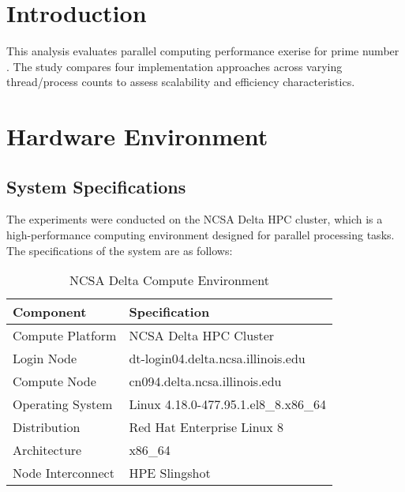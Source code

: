 \documentclass[11pt]{article}
\begin{document}






%








\section{Introduction}
This analysis evaluates parallel computing performance exerise for prime number . The study compares four implementation approaches across varying thread/process counts to assess scalability and efficiency characteristics.

\section{Hardware Environment}

\subsection{System Specifications}
The experiments were conducted on the NCSA Delta HPC cluster, which is a high-performance computing environment designed for parallel processing tasks. The specifications of the system are as follows:
\begin{table}[H]
\centering
\caption{NCSA Delta Compute Environment}
\label{tab:system_specs}
\begin{tabular}{@{}ll@{}}
\hline
\textbf{Component} & \textbf{Specification} \\
\hline
Compute Platform & NCSA Delta HPC Cluster \\
Login Node & dt-login04.delta.ncsa.illinois.edu \\
Compute Node & cn094.delta.ncsa.illinois.edu \\
Operating System & Linux 4.18.0-477.95.1.el8\_8.x86\_64 \\
Distribution & Red Hat Enterprise Linux 8 \\
Architecture & x86\_64 \\
Node Interconnect & HPE Slingshot \\
\hline
\end{tabular}
\end{table}
\end{document}
